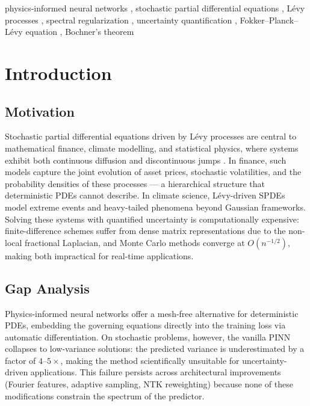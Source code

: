 \documentclass[times,12pt]{elsarticle}
\begin{document}
\begin{frontmatter}
\begin{keyword}
physics-informed neural networks \sep
stochastic partial differential equations \sep
L\'evy processes \sep
spectral regularization \sep
uncertainty quantification \sep
Fokker--Planck--L\'evy equation \sep
Bochner's theorem
\end{keyword}

\end{frontmatter}


\section{Introduction}
\label{sec:introduction}

\subsection{Motivation}

Stochastic partial differential equations driven by L\'evy processes are
central to mathematical finance, climate modelling, and statistical physics,
where systems exhibit both continuous diffusion and discontinuous jumps
\cite{ContTankov2003, MadanCarrChang1998}. In finance, such models capture
the joint evolution of asset prices, stochastic volatilities, and the
probability densities of these processes --- a hierarchical structure that
deterministic PDEs cannot describe. In climate science, L\'evy-driven SPDEs
model extreme events and heavy-tailed phenomena beyond Gaussian frameworks.
Solving these systems with quantified uncertainty is computationally
expensive: finite-difference schemes suffer from dense matrix representations
due to the non-local fractional Laplacian, and Monte Carlo methods converge
at $O(n^{-1/2})$, making both impractical for real-time applications.

\subsection{Gap Analysis}

Physics-informed neural networks \cite{Raissi2019} offer a mesh-free
alternative for deterministic PDEs, embedding the governing equations directly
into the training loss via automatic differentiation. On stochastic problems,
however, the vanilla PINN collapses to low-variance solutions: the predicted
variance is underestimated by a factor of $4$--$5\times$, making the method
scientifically unsuitable for uncertainty-driven applications. This failure
persists across architectural improvements (Fourier features, adaptive
sampling, NTK reweighting) because none of these modifications constrain the
spectrum of the predictor.
\end{document}
